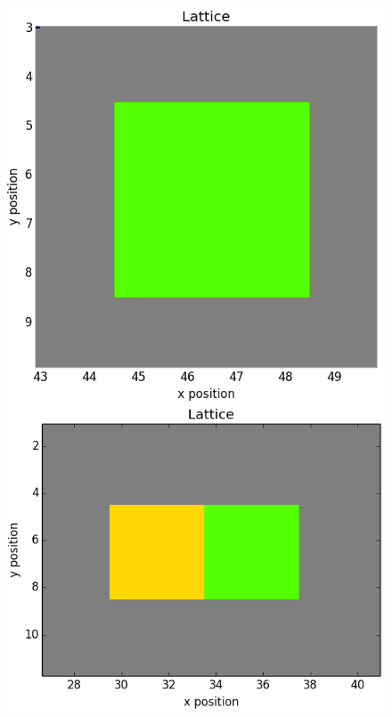 \documentclass[12pt]{article}
\begin{document}
\begin{figure}[H]
	\centering
	\includegraphics[scale=0.20]{img/1ctc_start}
	\includegraphics[scale=0.20]{img/2ctc_start}

\end{figure}
\end{document}
